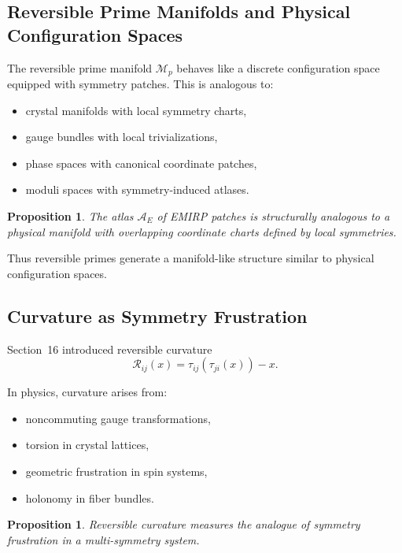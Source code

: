 \documentclass[11pt]{article}
\theoremstyle{definition}
\theoremstyle{plain}
\newtheorem{proposition}[definition]{Proposition}
\theoremstyle{remark}
\begin{document}
\subsection{Reversible Prime Manifolds and Physical Configuration Spaces}

The reversible prime manifold $\mathcal{M}_p$ behaves like a discrete
configuration space equipped with symmetry patches. This is analogous
to:

\begin{itemize}
    \item crystal manifolds with local symmetry charts,
    \item gauge bundles with local trivializations,
    \item phase spaces with canonical coordinate patches,
    \item moduli spaces with symmetry-induced atlases.
\end{itemize}

\begin{proposition}
The atlas $\mathcal{A}_E$ of EMIRP patches is structurally analogous to
a physical manifold with overlapping coordinate charts defined by local
symmetries.
\end{proposition}

Thus reversible primes generate a manifold-like structure similar to
physical configuration spaces.

\subsection{Curvature as Symmetry Frustration}

Section~16 introduced reversible curvature
\[
\mathcal{R}_{ij}(x) = \tau_{ij}(\tau_{ji}(x)) - x.
\]

In physics, curvature arises from:

\begin{itemize}
    \item noncommuting gauge transformations,
    \item torsion in crystal lattices,
    \item geometric frustration in spin systems,
    \item holonomy in fiber bundles.
\end{itemize}

\begin{proposition}
Reversible curvature measures the analogue of symmetry frustration in a
multi-symmetry system.
\end{proposition}
\end{document}

